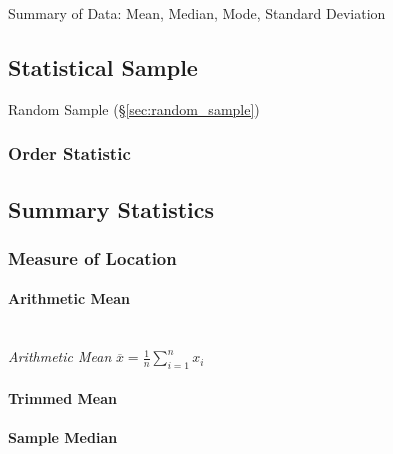 Summary of Data: Mean, Median, Mode, Standard Deviation



\subsection{Statistical Sample}\label{sec:statistical_sample}

Random Sample (\S\ref{sec:random_sample})



\subsubsection{Order Statistic}\label{sec:order_statistic}



\subsection{Summary Statistics}\label{sec:summary_statistics}

\subsubsection{Measure of Location}\label{sec:location_measure}

\paragraph{Arithmetic Mean}\label{sec:arithmetic_mean}
\hfill \\

\emph{Arithmetic Mean} $\overline{x} = \frac{1}{n}\sum_{i=1}^n x_i$



\paragraph{Trimmed Mean}\label{sec:trimmed_mean}

\paragraph{Sample Median}\label{sec:median}



